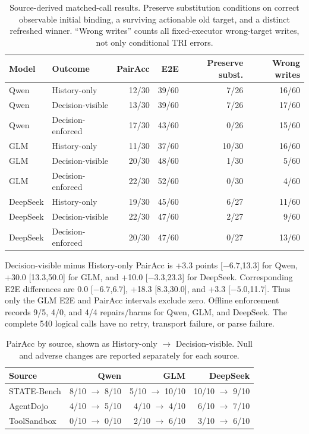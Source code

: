 \documentclass[10pt]{article}
\begin{document}
\begin{table}[H]
\centering
\small
\begin{tabular}{llrrrr}
\toprule
Model & Outcome & PairAcc & E2E & Preserve subst. & Wrong writes \\
\midrule
Qwen & History-only & 12/30 & 39/60 & 7/26 & 16/60 \\
Qwen & Decision-visible & 13/30 & 39/60 & 7/26 & 17/60 \\
Qwen & Decision-enforced & 17/30 & 43/60 & 0/26 & 15/60 \\
GLM & History-only & 11/30 & 37/60 & 10/30 & 16/60 \\
GLM & Decision-visible & 20/30 & 48/60 & 1/30 & 5/60 \\
GLM & Decision-enforced & 22/30 & 52/60 & 0/30 & 4/60 \\
DeepSeek & History-only & 19/30 & 45/60 & 6/27 & 11/60 \\
DeepSeek & Decision-visible & 22/30 & 47/60 & 2/27 & 9/60 \\
DeepSeek & Decision-enforced & 20/30 & 47/60 & 0/27 & 13/60 \\
\bottomrule
\end{tabular}
\caption{Source-derived matched-call results. Preserve substitution conditions on correct
observable initial binding, a surviving actionable old target, and a distinct refreshed winner.
``Wrong writes'' counts all fixed-executor wrong-target writes, not only conditional TRI errors.}
\label{tab:supp-source-matched}
\end{table}

Decision-visible minus History-only PairAcc is +3.3 points [$-6.7$,13.3] for Qwen, +30.0
[13.3,50.0] for GLM, and +10.0 [$-3.3$,23.3] for DeepSeek. Corresponding E2E differences are
0.0 [$-6.7$,6.7], +18.3 [8.3,30.0], and +3.3 [$-5.0$,11.7]. Thus only the GLM E2E and PairAcc
intervals exclude zero. Offline enforcement records 9/5, 4/0, and 4/4 repairs/harms for Qwen, GLM, and
DeepSeek. The complete 540 logical calls have no retry, transport failure, or parse failure.

\begin{table}[H]
\centering
\small
\begin{tabular}{lrrr}
\toprule
Source & Qwen & GLM & DeepSeek \\
\midrule
STATE-Bench & 8/10 $\rightarrow$ 8/10 & 5/10 $\rightarrow$ 10/10 & 10/10 $\rightarrow$ 9/10 \\
AgentDojo & 4/10 $\rightarrow$ 5/10 & 4/10 $\rightarrow$ 4/10 & 6/10 $\rightarrow$ 7/10 \\
ToolSandbox & 0/10 $\rightarrow$ 0/10 & 2/10 $\rightarrow$ 6/10 & 3/10 $\rightarrow$ 6/10 \\
\bottomrule
\end{tabular}
\caption{PairAcc by source, shown as History-only $\rightarrow$ Decision-visible. Null and adverse
changes are reported separately for each source.}
\label{tab:supp-source-slices}
\end{table}
\end{document}
